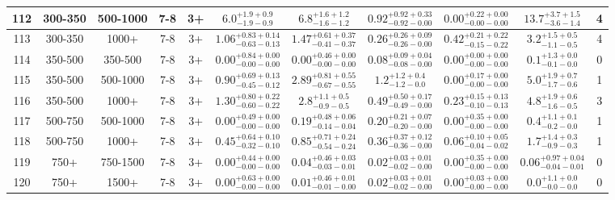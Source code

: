 \documentclass[11pt, oneside]{article}
\begin{document}
\begin{table}
{\begin{tabular}{ |c|c|c|c|c||c|c|c|c||c|c| }
112 & 300-350 & 500-1000 & 7-8 & 3+ & $6.0^{+1.9+0.9}_{-1.9-0.9}$ & $6.8^{+1.6+1.2}_{-1.6-1.2}$ & $0.92^{+0.92+0.33}_{-0.92-0.00}$ & $0.00^{+0.22+0.00}_{-0.00-0.00}$ & $13.7^{+3.7+1.5}_{-3.6-1.4}$ & 4 \\ \hline
113 & 300-350 & 1000+ & 7-8 & 3+ & $1.06^{+0.83+0.14}_{-0.63-0.13}$ & $1.47^{+0.61+0.37}_{-0.41-0.37}$ & $0.26^{+0.26+0.09}_{-0.26-0.00}$ & $0.42^{+0.21+0.22}_{-0.15-0.22}$ & $3.2^{+1.5+0.5}_{-1.1-0.5}$ & 4 \\ \hline
114 & 350-500 & 350-500 & 7-8 & 3+ & $0.00^{+0.84+0.00}_{-0.00-0.00}$ & $0.00^{+0.46+0.00}_{-0.00-0.00}$ & $0.08^{+0.09+0.04}_{-0.08-0.00}$ & $0.00^{+0.00+0.00}_{-0.00-0.00}$ & $0.1^{+1.3+0.0}_{-0.1-0.0}$ & 0 \\ \hline
115 & 350-500 & 500-1000 & 7-8 & 3+ & $0.90^{+0.69+0.13}_{-0.45-0.12}$ & $2.89^{+0.81+0.55}_{-0.67-0.55}$ & $1.2^{+1.2+0.4}_{-1.2-0.0}$ & $0.00^{+0.17+0.00}_{-0.00-0.00}$ & $5.0^{+1.9+0.7}_{-1.7-0.6}$ & 1 \\ \hline
116 & 350-500 & 1000+ & 7-8 & 3+ & $1.30^{+0.80+0.22}_{-0.60-0.22}$ & $2.8^{+1.1+0.5}_{-0.9-0.5}$ & $0.49^{+0.50+0.17}_{-0.49-0.00}$ & $0.23^{+0.15+0.13}_{-0.10-0.13}$ & $4.8^{+1.9+0.6}_{-1.6-0.5}$ & 3 \\ \hline
117 & 500-750 & 500-1000 & 7-8 & 3+ & $0.00^{+0.49+0.00}_{-0.00-0.00}$ & $0.19^{+0.48+0.06}_{-0.14-0.04}$ & $0.20^{+0.21+0.07}_{-0.20-0.00}$ & $0.00^{+0.35+0.00}_{-0.00-0.00}$ & $0.4^{+1.1+0.1}_{-0.2-0.0}$ & 1 \\ \hline
118 & 500-750 & 1000+ & 7-8 & 3+ & $0.45^{+0.64+0.10}_{-0.32-0.10}$ & $0.85^{+0.71+0.24}_{-0.54-0.24}$ & $0.36^{+0.37+0.12}_{-0.36-0.00}$ & $0.06^{+0.10+0.05}_{-0.04-0.02}$ & $1.7^{+1.4+0.3}_{-0.9-0.3}$ & 1 \\ \hline
119 & 750+ & 750-1500 & 7-8 & 3+ & $0.00^{+0.44+0.00}_{-0.00-0.00}$ & $0.04^{+0.46+0.03}_{-0.03-0.01}$ & $0.02^{+0.03+0.01}_{-0.02-0.00}$ & $0.00^{+0.35+0.00}_{-0.00-0.00}$ & $0.06^{+0.97+0.04}_{-0.04-0.01}$ & 0 \\ \hline
120 & 750+ & 1500+ & 7-8 & 3+ & $0.00^{+0.63+0.00}_{-0.00-0.00}$ & $0.01^{+0.46+0.01}_{-0.01-0.00}$ & $0.02^{+0.03+0.01}_{-0.02-0.00}$ & $0.00^{+0.03+0.00}_{-0.00-0.00}$ & $0.0^{+1.1+0.0}_{-0.0-0.0}$ & 0 \\ \hline
\end{tabular}}
\end{table}
\end{document}
